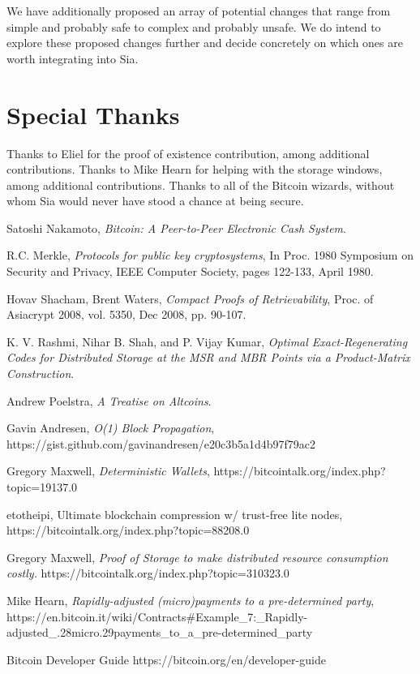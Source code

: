\documentclass[twocolumn]{article}
\begin{document}
We have additionally proposed an array of potential changes that range from simple and probably safe to complex and probably unsafe.
We do intend to explore these proposed changes further and decide concretely on which ones are worth integrating into Sia.

\section{Special Thanks}
Thanks to Eliel for the proof of existence contribution, among additional contributions.
Thanks to Mike Hearn for helping with the storage windows, among additional contributions.
Thanks to all of the Bitcoin wizards, without whom Sia would never have stood a chance at being secure.

\onecolumn
\begin{thebibliography}{9}

	Satoshi Nakamoto,
	\emph{Bitcoin: A Peer-to-Peer Electronic Cash System}.

	R.C. Merkle,
	\emph{Protocols for public key cryptosystems},
	In Proc. 1980 Symposium on Security and	Privacy,
	IEEE Computer Society, pages 122-133, April 1980.

	Hovav Shacham, Brent Waters,
	\emph{Compact Proofs of Retrievability},
	Proc. of Asiacrypt 2008, vol. 5350, Dec 2008, pp. 90-107.

	K. V. Rashmi, Nihar B. Shah, and P. Vijay Kumar,
	\emph{Optimal Exact-Regenerating Codes for Distributed Storage at the MSR and MBR Points via a Product-Matrix Construction}.

	Andrew Poelstra,
	\emph{A Treatise on Altcoins}.

	Gavin Andresen,
	\emph{O(1) Block Propagation},
	https://gist.github.com/gavinandresen/e20c3b5a1d4b97f79ac2

	Gregory Maxwell,
	\emph{Deterministic Wallets},
	https://bitcointalk.org/index.php?topic=19137.0

	etotheipi,
	Ultimate blockchain compression w/ trust-free lite nodes, \newline
	https://bitcointalk.org/index.php?topic=88208.0

	Gregory Maxwell,
	\emph{Proof of Storage to make distributed resource consumption costly.}
	https://bitcointalk.org/index.php?topic=310323.0

	Mike Hearn,
	\emph{Rapidly-adjusted (micro)payments to a pre-determined party},\newline
	https://en.bitcoin.it/wiki/Contracts\#Example\_7:\_Rapidly-adjusted\_.28micro.29payments\_to\_a\_pre-determined\_party

	Bitcoin Developer Guide
	https://bitcoin.org/en/developer-guide


\end{thebibliography}
\end{document}
